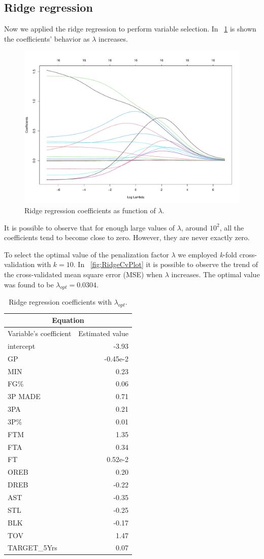 \subsection{Ridge regression}

Now we applied the ridge regression to perform variable selection. In \Fig~\ref{fig:RidgeCoefVsLambda} is shown the coefficients' behavior as $\lambda$ increases. 

\begin{figure}[h]
	\centering
	\includegraphics[width=0.4\linewidth]{ImageFiles/Regression/Ridge/RidgeCoefVsLambda}
	\caption{Ridge regression coefficients as function of $\lambda$.}
	\label{fig:RidgeCoefVsLambda}
\end{figure}

It is possible to observe that for enough large values of $\lambda$, around $10^2$, all the coefficients tend to become close to zero. However, they are never exactly zero.

To select the optimal value of the penalization factor $\lambda$ we employed \textit{k}-fold cross-validation with $\textit{k}=10$. In \Fig~\ref{fig:RidgeCvPlot} it is possible to observe the trend of the cross-validated mean square error (MSE) when $\lambda$ increases. The optimal value was found to be $\lambda_{opt} = 0.0304$.

\begin{table}[H]
	\centering
	\begin{tabular}{|| l | r ||} 
		\hline
		\multicolumn{2}{|c|}{Equation} \\
		\hline
		Variable's coefficient & Estimated value \\
		\hline
		intercept & -3.93 \\
		GP & -0.45e-2 \\
		MIN & 0.23 \\
		FG\% & 0.06 \\
		3P MADE & 0.71 \\
		3PA & 0.21 \\
		3P\% & 0.01 \\
		FTM & 1.35 \\
		FTA & 0.34 \\
		FT & 0.52e-2 \\
		OREB & 0.20 \\
		DREB & -0.22 \\
		AST & -0.35 \\			
		STL & -0.25 \\
		BLK & -0.17 \\
		TOV & 1.47 \\
		TARGET\_5Yrs & 0.07 \\				
		\hline
	\end{tabular}
	\caption{Ridge regression coefficients with $\lambda_{opt}$.}
	\label{table:FinalRidgeCoef}
\end{table}


